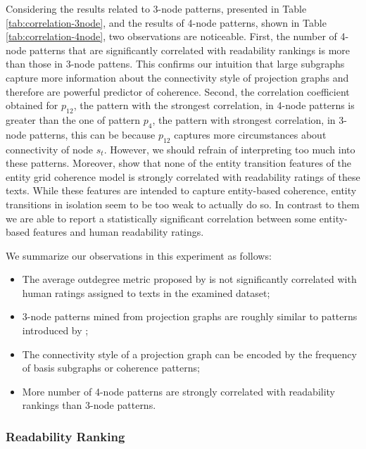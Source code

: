 Considering the results related to 3-node patterns, presented in Table \ref{tab:correlation-3node}, and the results of 4-node patterns, shown in Table \ref{tab:correlation-4node}, two observations are noticeable.
First, the number of 4-node patterns that are significantly correlated with readability rankings is more than those in 3-node pattens. 
This confirms our intuition that large subgraphs capture more information about the connectivity style of projection graphs and therefore are powerful predictor of coherence.  
Second, the correlation coefficient obtained for $p_{12}$, the pattern with the strongest correlation, in 4-node patterns is greater than the one of pattern $p_4$, the pattern with strongest correlation, in 3-node patterns, this can be because $p_{12}$ captures more circumstances about connectivity of node $s_t$. 
However, we should refrain of interpreting too much into these patterns. 
Moreover,  show that none of the entity transition features of the entity grid coherence model is strongly correlated with readability ratings of these texts. 
While these features are intended to capture entity-based coherence, entity transitions in isolation seem to be too weak to actually do so. 
In contrast to them we are able to report a statistically significant correlation between some entity-based features and human readability ratings.

We summarize our observations in this experiment as follows: 

\begin{itemize}

	\item The average outdegree metric proposed by  is not significantly correlated with human ratings assigned to texts in the examined dataset;

	\item 3-node patterns mined from projection graphs are roughly similar to patterns introduced by ;

	\item The connectivity style of a projection graph can be encoded by the frequency of basis subgraphs or coherence patterns; 

	\item More number of 4-node patterns are strongly correlated with readability rankings than 3-node patterns.

\end{itemize}


\subsubsection{Readability Ranking}

